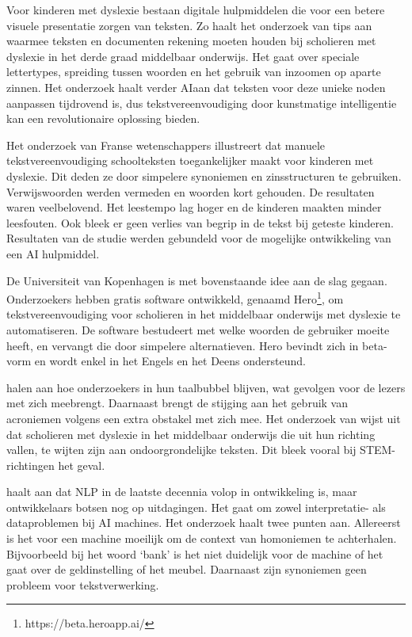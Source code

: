 Voor kinderen met dyslexie bestaan digitale hulpmiddelen die voor een betere visuele presentatie zorgen van teksten. Zo haalt het onderzoek van \textcite{Rello2012} tips aan waarmee teksten en documenten rekening moeten houden bij scholieren met dyslexie in het derde graad middelbaar onderwijs. Het gaat over speciale lettertypes, spreiding tussen woorden en het gebruik van inzoomen op aparte zinnen. Het onderzoek haalt verder AIaan dat teksten voor deze unieke noden aanpassen tijdrovend is, dus tekstvereenvoudiging door kunstmatige intelligentie kan een revolutionaire oplossing bieden. 

Het onderzoek van Franse wetenschappers \newline \textcite{Gala2016} illustreert dat manuele tekstvereenvoudiging schoolteksten toegankelijker \newline maakt voor kinderen met dyslexie. Dit deden ze door simpelere synoniemen en zinsstructuren te gebruiken. Verwijswoorden werden vermeden en woorden kort gehouden. De resultaten waren veelbelovend. Het leestempo lag hoger en de kinderen maakten minder leesfouten. Ook bleek er geen verlies van begrip in de tekst bij geteste kinderen. Resultaten van de studie werden gebundeld voor de mogelijke ontwikkeling van een AI hulpmiddel.

De Universiteit van Kopenhagen is met bovenstaande idee aan de slag gegaan. Onderzoekers \textcite{Bingel2018} hebben gratis software ontwikkeld, genaamd Hero\footnote{https://beta.heroapp.ai/}, om tekstvereenvoudiging voor scholieren in het middelbaar onderwijs met dyslexie te automatiseren. De software bestudeert met welke woorden de gebruiker moeite heeft, en vervangt die door simpelere alternatieven. Hero bevindt zich in beta-vorm en wordt enkel in het Engels en het Deens ondersteund. 

\textcite{PlavenSigray2017} halen aan hoe onderzoekers in hun taalbubbel blijven, wat gevolgen voor de lezers met zich meebrengt. Daarnaast brengt de stijging aan het gebruik van acroniemen volgens \textcite{Barnett2020} een extra obstakel met zich mee. Het onderzoek van \textcite{Donato2022} wijst uit dat scholieren met dyslexie in het middelbaar onderwijs die uit hun richting vallen, te wijten zijn aan ondoorgrondelijke teksten. Dit bleek vooral bij STEM-richtingen het geval. 

\textcite{Roldos2020} haalt aan dat NLP in de laatste decennia volop in ontwikkeling is, maar ontwikkelaars botsen nog op uitdagingen. Het gaat om zowel interpretatie- als dataproblemen bij AI machines. Het onderzoek haalt twee punten aan. Allereerst is het voor een machine moeilijk om de context van homoniemen te achterhalen. Bijvoorbeeld bij het woord ‘bank’ is het niet duidelijk voor de machine of het gaat over de geldinstelling of het meubel. Daarnaast zijn synoniemen geen probleem voor tekstverwerking.

